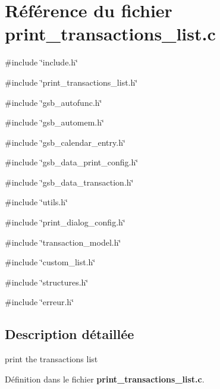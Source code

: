 \section{Référence du fichier print\_\-transactions\_\-list.c}
\label{print__transactions__list_8c}
{\ttfamily \#include \char`\"{}include.h\char`\"{}}\par
{\ttfamily \#include \char`\"{}print\_\-transactions\_\-list.h\char`\"{}}\par
{\ttfamily \#include \char`\"{}gsb\_\-autofunc.h\char`\"{}}\par
{\ttfamily \#include \char`\"{}gsb\_\-automem.h\char`\"{}}\par
{\ttfamily \#include \char`\"{}gsb\_\-calendar\_\-entry.h\char`\"{}}\par
{\ttfamily \#include \char`\"{}gsb\_\-data\_\-print\_\-config.h\char`\"{}}\par
{\ttfamily \#include \char`\"{}gsb\_\-data\_\-transaction.h\char`\"{}}\par
{\ttfamily \#include \char`\"{}utils.h\char`\"{}}\par
{\ttfamily \#include \char`\"{}print\_\-dialog\_\-config.h\char`\"{}}\par
{\ttfamily \#include \char`\"{}transaction\_\-model.h\char`\"{}}\par
{\ttfamily \#include \char`\"{}custom\_\-list.h\char`\"{}}\par
{\ttfamily \#include \char`\"{}structures.h\char`\"{}}\par
{\ttfamily \#include \char`\"{}erreur.h\char`\"{}}\par


\subsection{Description détaillée}
print the transactions list 

Définition dans le fichier {\bf print\_\-transactions\_\-list.c}.

